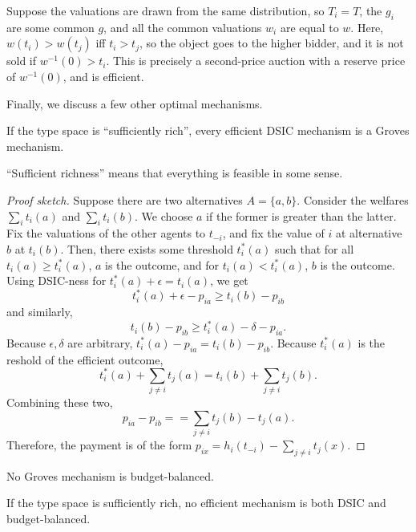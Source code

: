 		\begin{fex}
			Suppose the valuations are drawn from the same distribution, so $T_i = T$, the $g_i$ are some common $g$, and all the common valuations $w_i$ are equal to $w$. Here, $w(t_i) > w(t_j)$ iff $t_i > t_j$, so the object goes to the higher bidder, and it is not sold if $w^{-1}(0) > t_i$. This is precisely a second-price auction with a reserve price of $w^{-1}(0)$, and is efficient. 
		\end{fex}

		Finally, we discuss a few other optimal mechanisms.

		\begin{ftheo}
			If the type space is ``sufficiently rich'', every efficient DSIC mechanism is a Groves mechanism.
		\end{ftheo}
		``Sufficient richness'' means that everything is feasible in some sense.
		\begin{proof}[Proof sketch]
			Suppose there are two alternatives $A = \{a,b\}$. Consider the welfares $\sum_i t_i(a)$ and $\sum_i t_i(b)$. We choose $a$ if the former is greater than the latter. Fix the valuations of the other agents to $t_{-i}$, and fix the value of $i$ at alternative $b$ at $t_i(b)$. Then, there exists some threshold $t_i^*(a)$ such that for all $t_i(a) \ge t_i^*(a)$, $a$ is the outcome, and for $t_i(a) < t_i^*(a)$, $b$ is the outcome.\\
			Using DSIC-ness for $t_i^*(a) + \epsilon = t_i(a)$, we get
			\[ t_i^*(a) + \epsilon - p_{ia} \ge t_i(b) - p_{ib} \]
			and similarly,
			\[ t_i(b) - p_{ib} \ge t_i^*(a) - \delta - p_{ia}. \]
			Because $\epsilon,\delta$ are arbitrary, $t_i^*(a) - p_{ia} = t_i(b) - p_{ib}$. Because $t_i^*(a)$ is the reshold of the efficient outcome,
			\[ t_i^*(a) + \sum_{j \ne i} t_j(a) = t_i(b) + \sum_{j \ne i} t_j(b). \]
			Combining these two,
			\[ p_{ia} - p_{ib} == \sum_{j \ne i} t_j(b) - t_j(a). \]
			Therefore, the payment is of the form $p_{ix} = h_i(t_{-i}) - \sum_{j \ne i} t_j(x)$.
		\end{proof}

		\begin{ftheo}
			No Groves mechanism is budget-balanced.
		\end{ftheo}

		\begin{fcor}
			If the type space is sufficiently rich, no efficient mechanism is both DSIC and budget-balanced. 
		\end{fcor}

